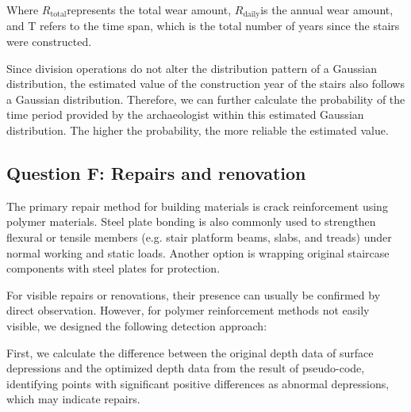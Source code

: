 \documentclass{mcmthesis}
\begin{document}
Where $R_{\text{total}}$​ represents the total wear amount, $R_{\text{daily}}$​ is the annual wear amount, and T refers to the time span, which is the total number of years since the stairs were constructed.

Since division operations do not alter the distribution pattern of a Gaussian distribution, the estimated value of the construction year of the stairs also follows a Gaussian distribution. Therefore, we can further calculate the probability of the time period provided by the archaeologist within this estimated Gaussian distribution. The higher the probability, the more reliable the estimated value.

\subsection{Question F: Repairs and renovation}

The primary repair method for building materials is crack reinforcement using polymer materials\cite{YTLX200401034}. Steel plate bonding is also commonly used to strengthen flexural or tensile members (e.g. stair platform beams, slabs, and treads) under normal working and static loads. Another option is wrapping original staircase components with steel plates for protection.

For visible repairs or renovations, their presence can usually be confirmed by direct observation. However, for polymer reinforcement methods not easily visible, we designed the following detection approach:

First, we calculate the difference between the original depth data of surface depressions and the optimized depth data from the result of pseudo-code, identifying points with significant positive differences as abnormal depressions, which may indicate repairs.
\end{document}
